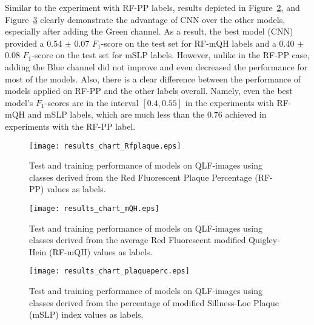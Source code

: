 \documentclass[runningheads,a4paper]{llncs}
\begin{document}
Similar to the experiment with RF-PP labels, results depicted in Figure~\ref{fig:barchart_mqh}, and Figure~\ref{fig:barchart_plaqueperc} clearly demonstrate the advantage of CNN over the other models, especially after adding the Green channel. As a result, the best model (CNN) provided a 0.54 $\pm$ 0.07 $F_1$-score on the test set for RF-mQH labels and a 0.40 $\pm$ 0.08 $F_1$-score on the test set for mSLP labels. However, unlike in the RF-PP case, adding the Blue channel did not improve and even decreased the performance for most of the models. Also, there is a clear difference between the performance of models applied on RF-PP and the other labels overall. Namely, even the best model's $F_1$-scores are in the interval ${[0.4, 0.55]}$ in the experiments with RF-mQH and mSLP labels, which are much less than the 0.76 achieved in experiments with the RF-PP label.
\begin{figure}[]
\centering
\texttt{[image: results\_chart\_Rfplaque.eps]}
\caption{Test and training performance of models on QLF-images using classes derived from the Red Fluorescent Plaque Percentage (RF-PP) values as labels.}
\label{fig:barchart_rfplaque}
\end{figure}

\begin{figure}[]
\centering
\texttt{[image: results\_chart\_mQH.eps]}
\caption{Test and training performance of models on QLF-images using classes derived from the average Red Fluorescent modified Quigley-Hein (RF-mQH) values as labels.}
\label{fig:barchart_mqh}
\end{figure}

\begin{figure}[]
\centering
\texttt{[image: results\_chart\_plaqueperc.eps]}
\caption{Test and training performance of models on QLF-images using classes derived from the percentage of modified Sillness-Loe Plaque (mSLP) index values as labels.}
\label{fig:barchart_plaqueperc}
\end{figure}
\end{document}
